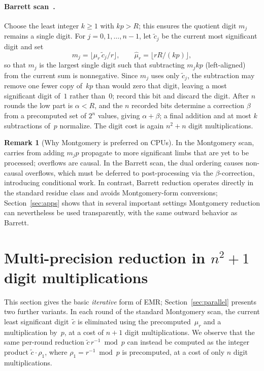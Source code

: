 \documentclass[reqno]{amsart}
\theoremstyle{definition}
\newtheorem{remark}[theorem]{Remark}
\begin{document}
\paragraph{Barrett scan~\cite{domb2025blog}.}
Choose the least integer $k\ge 1$ with $kp>R$; this ensures the quotient digit $m_j$ remains a single digit.
For $j=0,1,\ldots,n-1$, let $\tilde c_j$ be the current most significant digit and set
\[
  m_j = \bigl\lfloor \hat\mu_r\, \tilde c_j / r \bigr\rfloor,
  \qquad \hat\mu_r = \bigl\lfloor rR/(kp) \bigr\rfloor,
\]
so that $m_j$ is the largest single digit such that subtracting $m_j kp$ (left-aligned) from the current sum is nonneg\-ative.
Since $m_j$ uses only $\tilde c_j$, the subtraction may remove one fewer copy of~$kp$ than would zero that digit, leaving a most significant digit of~$1$ rather than~$0$; record this bit and discard the digit.
After $n$ rounds the low part is $\alpha<R$, and the $n$ recorded bits determine a correction $\beta$ from a precomputed set of $2^n$ values, giving $\alpha+\beta$; a final addition and at most $k$ subtractions of~$p$ normalize.
The digit cost is again $n^2+n$ digit multiplications.

\begin{remark}[Why Montgomery is preferred on CPUs]\label{rem:causal}
In the Montgomery scan, carries from adding $m_jp$ propagate to more significant limbs that are yet to be processed; overflows are causal.
In the Barrett scan, the dual ordering causes non-causal overflows, which must be deferred to post-processing via the $\beta$-correction, introducing conditional work.
In contrast, Barrett reduction operates directly in the standard residue class and avoids Montgomery-form conversions; Section~\ref{sec:apps} shows that in several important settings Montgomery reduction can nevertheless be used transparently, with the same outward behavior as Barrett.
\end{remark}

\section{Multi-precision reduction in $n^2+1$ digit multiplications}\label{sec:improved}

This section gives the basic \emph{iterative} form of EMR; Section~\ref{sec:parallel} presents two further variants.
In each round of the standard Montgomery scan, the current least significant digit~$\tilde c$ is eliminated using the precomputed~$\mu_r$ and a multiplication by~$p$, at a cost of $n+1$ digit multiplications.
We observe that the same per-round reduction $\tilde c\, r^{-1} \bmod p$ can instead be computed as the integer product $\tilde c \cdot \rho_1$, where $\rho_1 = r^{-1}\bmod p$ is precomputed, at a cost of only $n$ digit multiplications.
\end{document}
